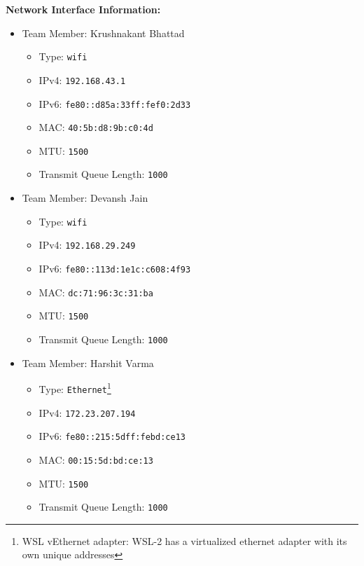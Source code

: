 \documentclass[11pt, fleqn]{article}
\begin{document}
\textbf{Network Interface Information:}
\begin{itemize}
 
    \item Team Member: Krushnakant Bhattad
    \begin{itemize}[itemsep=-0.5ex]
    \item Type: \texttt{wifi}
    \item IPv4: \texttt{192.168.43.1    }
    \item IPv6: \texttt{fe80::d85a:33ff:fef0:2d33 }  
    \item MAC: \texttt{40:5b:d8:9b:c0:4d}
    \item MTU: \texttt{1500}
    \item Transmit Queue Length: \texttt{1000}
    \end{itemize}
    
    \item Team Member: Devansh Jain
    \begin{itemize}[itemsep=-0.5ex]
        \item Type: \texttt{wifi}
        \item IPv4: \texttt{192.168.29.249}
        \item IPv6: \texttt{fe80::113d:1e1c:c608:4f93}
        \item MAC: \texttt{dc:71:96:3c:31:ba}
        \item MTU: \texttt{1500}
        \item Transmit Queue Length: \texttt{1000}
    \end{itemize}
    
    \item Team Member: Harshit Varma
    \begin{itemize}[itemsep=-0.5ex]
    \item Type: \texttt{Ethernet}\footnote{WSL vEthernet adapter: WSL-2 has a virtualized ethernet adapter with its own unique addresses}
        \item IPv4: \texttt{172.23.207.194}
        \item IPv6: \texttt{fe80::215:5dff:febd:ce13}
        \item MAC: \texttt{00:15:5d:bd:ce:13}
        \item MTU: \texttt{1500}
        \item Transmit Queue Length: \texttt{1000}
    \end{itemize}

\end{itemize}

\hrulefill
\medskip
\end{document}

